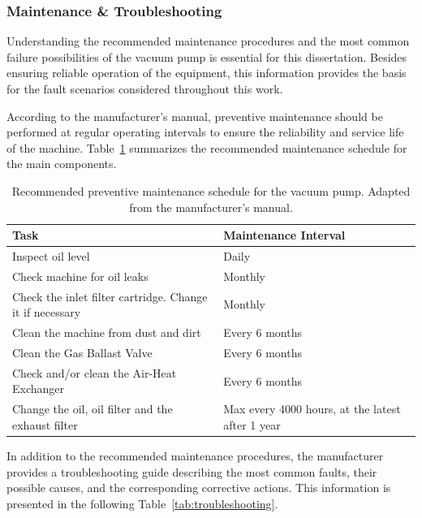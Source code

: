 \subsubsection{Maintenance \& Troubleshooting} \label{sec:maintenance}

Understanding the recommended maintenance procedures and the most common failure possibilities of the vacuum pump is essential for this dissertation. Besides ensuring 
reliable operation of the equipment, this information provides the basis for the fault scenarios considered throughout this work.

According to the manufacturer's manual, preventive maintenance should be performed at regular operating intervals to ensure the reliability and service 
life of the machine. Table~\ref{tab:maintenance} summarizes the recommended maintenance schedule for the main components.

\begin{table}[htbp]
\centering
\caption{Recommended preventive maintenance schedule for the vacuum pump. Adapted from the manufacturer's manual.}
\label{tab:maintenance}

\begin{tabular}{ll}
\hline
\textbf{Task} & \textbf{Maintenance Interval} \\
\hline
Inspect oil level & Daily \\
Check machine for oil leaks & Monthly \\
Check the inlet filter cartridge. Change it if necessary & Monthly \\
Clean the machine from dust and dirt & Every 6 months \\
Clean the Gas Ballast Valve & Every 6 months \\
Check and/or clean the Air-Heat Exchanger & Every 6 months \\
Change the oil, oil filter and the exhaust filter  & Max every 4000 hours, at the latest after 1 year\\
\hline
\end{tabular}
\end{table}

In addition to the recommended maintenance procedures, the manufacturer provides a troubleshooting guide describing the most common faults, their possible causes, 
and the corresponding corrective actions. This information is presented in the following Table~\ref{tab:troubleshooting}.

